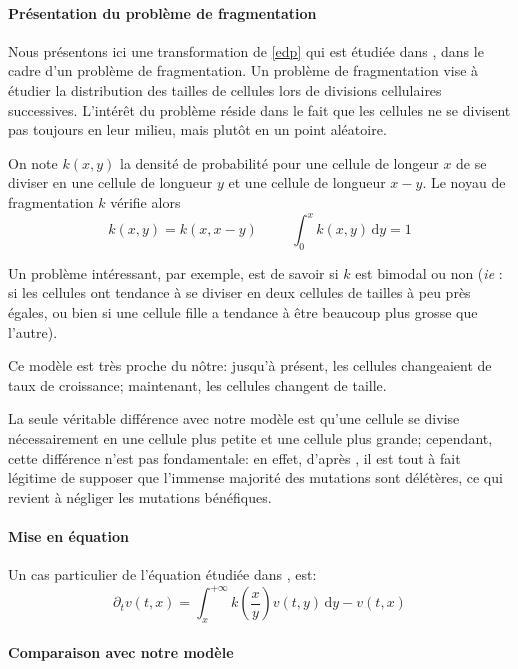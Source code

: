 \documentclass[12pt]{article}
\newcommand{\pth}[1]{\left(#1\right)}
\newcommand{\esp}{\hspace{1cm}}
\newcommand{\ie}{\emph{ie} }
\newcommand{\de}{\,\mathrm{d}}
\newcommand{\dr}{\partial}
\begin{document}
\paragraph{Présentation du problème de fragmentation}
Nous présentons ici une transformation de \eqref{edp} qui est étudiée dans \cite{md1}, \cite{md2} dans le cadre d'un problème de fragmentation. Un problème de fragmentation vise à étudier la distribution des tailles de cellules lors de divisions cellulaires successives. L'intérêt du problème réside dans le fait que les cellules ne se divisent pas toujours en leur milieu, mais plutôt en un point aléatoire.

On note $k(x,y)$ la densité de probabilité pour une cellule de longeur $x$ de se diviser en une cellule de longueur $y$ et une cellule de longueur $x-y$. Le noyau de fragmentation $k$ vérifie alors \[k(x,y)=k(x,x-y)\esp \int_0^xk(x,y)\de y=1\]

Un problème intéressant, par exemple, est de savoir si $k$ est bimodal ou non (\ie: si les cellules ont tendance à se diviser en deux cellules de tailles à peu près égales, ou bien si une cellule fille a tendance à être beaucoup plus grosse que l'autre).

Ce modèle est très proche du nôtre: jusqu'à présent, les cellules changeaient de taux de croissance; maintenant, les cellules changent de taille.

La seule véritable différence avec notre modèle est qu'une cellule se divise nécessairement en une cellule plus petite et une cellule plus grande; cependant, cette différence n'est pas fondamentale: en effet, d'après \cite{rob}, il est tout à fait légitime de supposer que l'immense majorité des mutations sont délétères, ce qui revient à négliger les mutations bénéfiques.

\paragraph{Mise en équation} 

Un cas particulier de l'équation étudiée dans \cite{md1}, \cite{md2} est:
\begin{equation}\label{edp_frag}
\dr_tv(t,x)=\int_x^{+\infty}k\pth{\frac{x}{y}}v(t,y)\de y-v(t,x)
\end{equation}


\paragraph{Comparaison avec notre modèle}
\end{document}

